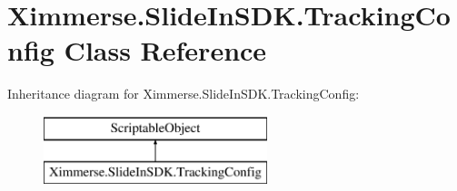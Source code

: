 \hypertarget{class_ximmerse_1_1_slide_in_s_d_k_1_1_tracking_config}{}\section{Ximmerse.\+Slide\+In\+S\+D\+K.\+Tracking\+Config Class Reference}
\label{class_ximmerse_1_1_slide_in_s_d_k_1_1_tracking_config}
Inheritance diagram for Ximmerse.\+Slide\+In\+S\+D\+K.\+Tracking\+Config\+:\begin{figure}[H]
\begin{center}
\leavevmode
\includegraphics[height=2.000000cm]{class_ximmerse_1_1_slide_in_s_d_k_1_1_tracking_config}
\end{center}
\end{figure}
